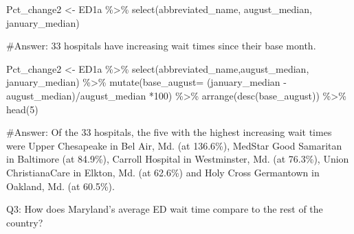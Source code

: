 \documentclass[
  letterpaper,
  DIV=11,
  numbers=noendperiod]{scrartcl}
\newenvironment{Shaded}{\begin{snugshade}}{\end{snugshade}}
\newcommand{\AttributeTok}[1]{\textcolor[rgb]{0.40,0.45,0.13}{#1}}
\newcommand{\CommentTok}[1]{\textcolor[rgb]{0.37,0.37,0.37}{#1}}
\newcommand{\DecValTok}[1]{\textcolor[rgb]{0.68,0.00,0.00}{#1}}
\newcommand{\FunctionTok}[1]{\textcolor[rgb]{0.28,0.35,0.67}{#1}}
\newcommand{\NormalTok}[1]{\textcolor[rgb]{0.00,0.23,0.31}{#1}}
\newcommand{\OtherTok}[1]{\textcolor[rgb]{0.00,0.23,0.31}{#1}}
\newcommand{\SpecialCharTok}[1]{\textcolor[rgb]{0.37,0.37,0.37}{#1}}
\begin{document}
\begin{Shaded}
\begin{Highlighting}[]
\NormalTok{Pct\_change2 }\OtherTok{\textless{}{-}}\NormalTok{ ED1a }\SpecialCharTok{\%\textgreater{}\%} 
  \FunctionTok{select}\NormalTok{(abbreviated\_name, august\_median, january\_median) }

\CommentTok{\#Answer: 33 hospitals have increasing wait times since their base month.}

\NormalTok{Pct\_change2 }\OtherTok{\textless{}{-}}\NormalTok{ ED1a }\SpecialCharTok{\%\textgreater{}\%} 
  \FunctionTok{select}\NormalTok{(abbreviated\_name,august\_median, january\_median) }\SpecialCharTok{\%\textgreater{}\%} 
    \FunctionTok{mutate}\NormalTok{(}\AttributeTok{base\_august=}\NormalTok{ (january\_median }\SpecialCharTok{{-}}\NormalTok{ august\_median)}\SpecialCharTok{/}\NormalTok{august\_median }\SpecialCharTok{*}\DecValTok{100}\NormalTok{) }\SpecialCharTok{\%\textgreater{}\%} 
  \FunctionTok{arrange}\NormalTok{(}\FunctionTok{desc}\NormalTok{(base\_august)) }\SpecialCharTok{\%\textgreater{}\%} 
  \FunctionTok{head}\NormalTok{(}\DecValTok{5}\NormalTok{)}
  
\CommentTok{\#Answer: Of the 33 hospitals, the five with the highest increasing wait times were Upper Chesapeake in Bel Air, Md. (at 136.6\%), MedStar Good Samaritan in Baltimore (at 84.9\%), Carroll Hospital in Westminster, Md. (at 76.3\%), Union ChristianaCare in Elkton, Md. (at 62.6\%) and Holy Cross Germantown in Oakland, Md. (at 60.5\%).}
\end{Highlighting}
\end{Shaded}

Q3: How does Maryland's average ED wait time compare to the rest of the
country?
\end{document}
